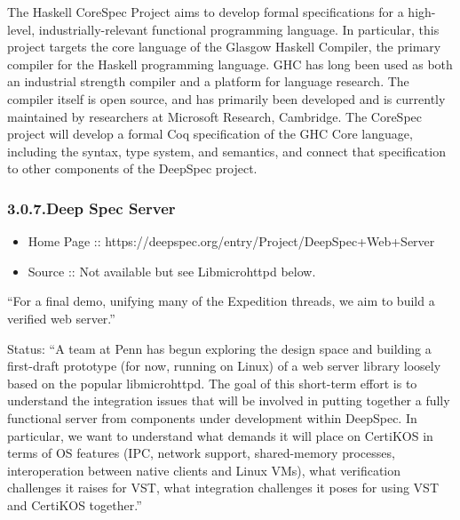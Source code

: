 \documentclass[12pt,twoside]{article}
\begin{document}
\noindent{}The Haskell CoreSpec Project aims to develop formal specifications for
a high-level, industrially-relevant functional programming
language. In particular, this project targets the core language of the
Glasgow Haskell Compiler, the primary compiler for the Haskell
programming language. GHC has long been used as both an industrial
strength compiler and a platform for language research. The compiler
itself is open source, and has primarily been developed and is
currently maintained by researchers at Microsoft Research,
Cambridge. The CoreSpec project will develop a formal Coq
specification of the GHC Core language, including the syntax, type
system, and semantics, and connect that specification to other
components of the DeepSpec project.%

\subsubsection{3.0.7.\hspace*{0.5em}Deep Spec Server}\label{sec-deep-spec-server}%

\begin{itemize}[noitemsep,topsep=\mdcompacttopsep]%

\item{}Home Page :: https://deepspec.org/entry/Project/DeepSpec+Web+Server%

\item{}Source :: Not available but see Libmicrohttpd below.%
\end{itemize}%

\noindent{}\textquotedblleft{}For a final demo, unifying many of the Expedition threads, we aim to
build a verified web server.\textquotedblright{}%

Status: \textquotedblleft{}A team at Penn has begun exploring the design space and
building a first-draft prototype (for now, running on Linux) of a web
server library loosely based on the popular libmicrohttpd.  The goal
of this short-term effort is to understand the integration issues that
will be involved in putting together a fully functional server from
components under development within DeepSpec.  In particular, we want
to understand what demands it will place on CertiKOS in terms of OS
features (IPC, network support, shared-memory processes,
interoperation between native clients and Linux VMs), what
verification challenges it raises for VST, what integration challenges
it poses for using VST and CertiKOS together.\textquotedblright{}%
\end{document}
